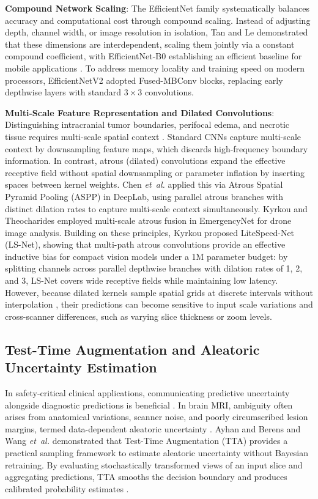 \noindent\textbf{Compound Network Scaling}: The EfficientNet family \cite{30} systematically balances accuracy and computational cost through compound scaling. Instead of adjusting depth, channel width, or image resolution in isolation, Tan and Le demonstrated that these dimensions are interdependent, scaling them jointly via a constant compound coefficient, with EfficientNet-B0 establishing an efficient baseline for mobile applications \cite{30}. To address memory locality and training speed on modern processors, EfficientNetV2 \cite{31} adopted Fused-MBConv blocks, replacing early depthwise layers with standard $3\times3$ convolutions.

\noindent\textbf{Multi-Scale Feature Representation and Dilated Convolutions}: Distinguishing intracranial tumor boundaries, perifocal edema, and necrotic tissue requires multi-scale spatial context \cite{2, 23, 39}. Standard CNNs capture multi-scale context by downsampling feature maps, which discards high-frequency boundary information. In contrast, atrous (dilated) convolutions \cite{5} expand the effective receptive field without spatial downsampling or parameter inflation by inserting spaces between kernel weights. Chen \emph{et~al.} \cite{5} applied this via Atrous Spatial Pyramid Pooling (ASPP) in DeepLab, using parallel atrous branches with distinct dilation rates to capture multi-scale context simultaneously. Kyrkou and Theocharides \cite{17} employed multi-scale atrous fusion in EmergencyNet for drone image analysis. Building on these principles, Kyrkou \cite{16} proposed LiteSpeed-Net (LS-Net), showing that multi-path atrous convolutions provide an effective inductive bias for compact vision models under a 1M parameter budget: by splitting channels across parallel depthwise branches with dilation rates of 1, 2, and 3, LS-Net covers wide receptive fields while maintaining low latency. However, because dilated kernels sample spatial grids at discrete intervals without interpolation \cite{5, 16}, their predictions can become sensitive to input scale variations and cross-scanner differences, such as varying slice thickness or zoom levels.

\subsection{Test-Time Augmentation and Aleatoric Uncertainty Estimation}
In safety-critical clinical applications, communicating predictive uncertainty alongside diagnostic predictions is beneficial \cite{7, 41}. In brain MRI, ambiguity often arises from anatomical variations, scanner noise, and poorly circumscribed lesion margins, termed data-dependent aleatoric uncertainty \cite{4, 35}. Ayhan and Berens \cite{4} and Wang \emph{et~al.} \cite{35} demonstrated that Test-Time Augmentation (TTA) provides a practical sampling framework to estimate aleatoric uncertainty without Bayesian retraining. By evaluating stochastically transformed views of an input slice and aggregating predictions, TTA smooths the decision boundary and produces calibrated probability estimates \cite{4, 35, 42}.

